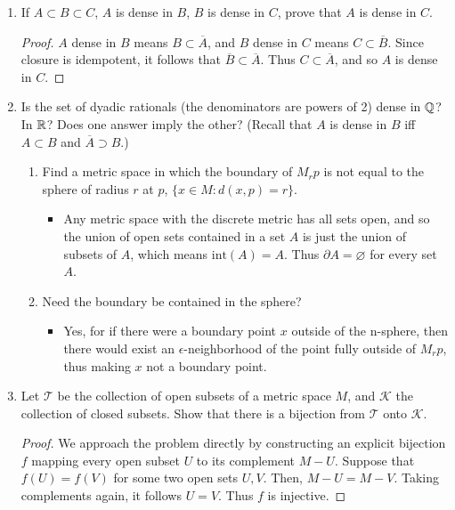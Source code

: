 \documentclass[11pt, a4paper, latinreim, shortsets]{notes}
\newcommand{\topo}{\mathcal{T}}
\newcommand{\cl}[1]{\overline{#1}}
\begin{document}
\begin{enumerate}[label={\bfseries 2.\arabic*}]
	\item If $A \subset B \subset C$, $A$ is dense in $B$, $B$ is dense in $C$, prove that
	$A$ is dense in $C$.
	\begin{proof}
		$A$ dense in $B$ means $B \subset \cl{A}$, and $B$ dense in $C$ means $C \subset \cl{B}$.
		Since closure is idempotent, it follows that $\cl{B} \subset \cl{A}$. Thus $C \subset \cl{A}$,
		and so $A$ is dense in $C$.
	\end{proof}

\item Is the set of dyadic rationals (the denominators are powers of 2) dense in $\mathbb{Q}$?
	In $\mathbb{R}$? Does one answer imply the other? (Recall that $A$ is dense in $B$ iff $A \subset B$ and
	$\cl{A} \supset B$.)

	\begin{enumerate}[label=\alph*)]
		\item Find a metric space in which the boundary of $M_rp$ is not equal to the sphere of radius
		$r$ at $p$, $\{x\in M:d(x,p) = r\}$.
		\begin{itemize}
			\item[] Any metric space with the discrete metric has all sets open, and so the union of
			open sets contained in a set $A$ is just the union of subsets of $A$, which means
			$\text{int}(A)=A$. Thus $\partial A = \varnothing$ for every set $A$.
		\end{itemize}
		\item Need the boundary be contained in the sphere?
		\begin{itemize}
			\item[] Yes, for if there were a boundary point $x$ outside of the n-sphere, then there
			would exist an $\epsilon$-neighborhood of the point fully outside of $M_rp$, thus making
			$x$ not a boundary point.
		\end{itemize}
	\end{enumerate}

	\item Let $\topo$ be the collection of open subsets of a metric space $M$, and $\mathcal{K}$
	the collection of closed subsets. Show that there is a bijection from $\topo$ onto $\mathcal{K}$.
	\begin{proof}
		We approach the problem directly by constructing an explicit bijection $f$
		mapping every open subset $U$ to its complement $M - U$. Suppose that $f(U) = f(V)$
		for some two open sets $U,V$. Then, $M - U = M - V$. Taking complements again,
		it follows $U = V$. Thus $f$ is injective.


\end{proof}
\end{enumerate}
\end{document}
